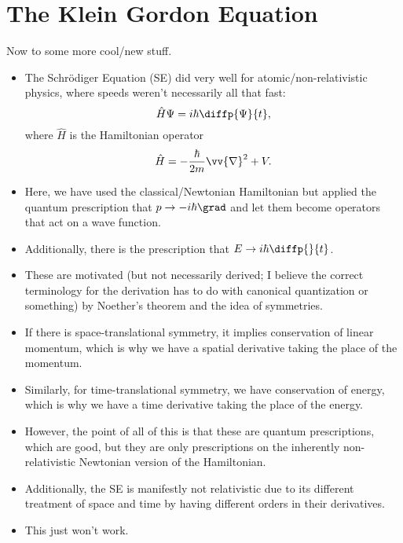 \section{The Klein Gordon Equation}


Now to some more cool/new stuff.


\begin{itemize}
    \item The Schr\"odiger Equation (SE) did very well for atomic/non-relativistic physics, where speeds weren't necessarily all that fast:
        \begin{equation}
            \hat{H}\Psi = i\hbar \diffp{\Psi}{t},
        \end{equation}
        where $\hat{H}$ is the Hamiltonian operator
        \begin{equation}
            \hat{H} = -\frac{\hbar}{2m} \vv{\nabla}^2 + V.
        \end{equation}
    \item Here, we have used the classical/Newtonian Hamiltonian but applied the quantum prescription that $p \rightarrow -i\hbar \grad$ and let them become operators that act on a wave function.
    \item Additionally, there is the prescription that $E \rightarrow i\hbar \diffp{}{t}$.
    \item These are motivated (but not necessarily derived; I believe the correct terminology for the derivation has to do with canonical quantization or something) by Noether's theorem and the idea of symmetries.
    \item If there is space-translational symmetry, it implies conservation of linear momentum, which is why we have a spatial derivative taking the place of the momentum.
    \item Similarly, for time-translational symmetry, we have conservation of energy, which is why we have a time derivative taking the place of the energy.
\end{itemize}


\begin{itemize}
    \item However, the point of all of this is that these are quantum prescriptions, which are good, but they are only prescriptions on the inherently non-relativistic Newtonian version of the Hamiltonian.
    \item Additionally, the SE is manifestly not relativistic due to its different treatment of space and time by having different orders in their derivatives.
    \item This just won't work.
\end{itemize}



